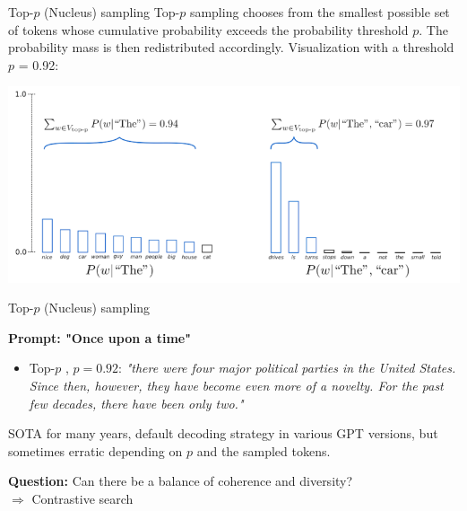 \begin{vbframe}{Top-$p$ (Nucleus) sampling}
Top-$p$ sampling chooses from the smallest possible set of tokens whose cumulative probability exceeds the probability threshold $p$. The probability mass is then redistributed accordingly.
Visualization with a threshold $p$ = 0.92:

\begin{center}
\includegraphics[width=1.0\linewidth]{figure/nucleus.png}
\end{center}

\end{vbframe}


\begin{vbframe}{Top-$p$ (Nucleus) sampling}

\vfill
\textbf{Prompt: "Once upon a time"}
\begin{itemize}
    \item Top-$p$ , $p = 0.92$: \textit{"there were four major political parties in the United States. Since then, however, they have become even more of a novelty. For the past few decades, there have been only two."}
\end{itemize}

\vspace{2ex}

SOTA for many years, default decoding strategy in various GPT versions, but sometimes erratic depending on $p$ and the sampled tokens.\\

\vspace{2ex}

\textbf{Question:} Can there be a balance of coherence and diversity?\\
$\Rightarrow$ Contrastive search
  
\end{vbframe}

